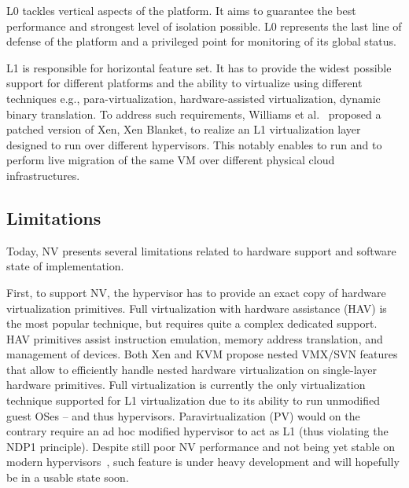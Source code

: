 \documentclass{sig-alternate}
\begin{document}
L0 tackles vertical aspects of the platform. It aims to guarantee the best performance and strongest level of isolation possible. L0 represents the last line of defense of the platform and a privileged point for monitoring of its global status.

L1 is responsible for horizontal feature set. It has to provide the widest possible support for different platforms and the ability to virtualize using different techniques e.g., para-virtualization, hardware-assisted virtualization, dynamic binary translation. {\sffamily To address such requirements, Williams et al.~\cite{art:blan} proposed a patched version of Xen, Xen Blanket, to realize an L1 virtualization layer designed to run over different hypervisors. This notably enables to run and to perform live migration of the same VM over different physical cloud infrastructures.} %

\subsection{Limitations}

\noindent Today, NV presents several limitations related to hardware support {\sffamily and software state of implementation}. 

First, to support NV, the hypervisor has to provide an exact copy of hardware virtualization primitives. Full virtualization with hardware assistance (HAV) is the most popular technique, but requires quite a complex dedicated support.
HAV primitives assist instruction emulation, memory address translation, and management of devices. Both Xen and KVM propose {\sffamily nested VMX/SVN features} that allow to efficiently handle nested hardware virtualization on single-layer hardware primitives.
Full virtualization is currently the only virtualization technique supported for L1 virtualization due to its ability to run unmodified guest OSes -- and thus hypervisors. Paravirtualization (PV) would on the contrary require an ad hoc modified hypervisor to act as L1 (thus violating the NDP1 principle).
Despite still poor NV performance and not being yet stable on modern hypervisors~\cite{xen:test}, such feature is under heavy development and will hopefully be in a usable state soon.
\end{document}
